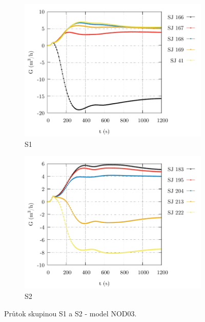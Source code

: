 \begin{figure}
	\centering
	\begin{subfigure}{0.5\textwidth}
		\centering
		\includegraphics[width=\textwidth, trim={0cm 0cm 0cm 0cm}, clip]{./05_TH_model_VR_1/grafy/G_time_nod_03_0.pdf}
				\caption{S1}
		\label{fig:g_time_nod_03_0_prilohy}
	\end{subfigure}%
	\hfill
	\begin{subfigure}{0.5\textwidth}
	\centering
	\includegraphics[width=\textwidth, trim={0cm 0cm 0cm 0cm}, clip]{./05_TH_model_VR_1/grafy/G_time_nod_03_1.pdf}
			\caption{S2}
	\label{fig:g_time_nod_03_1_prilohy}
\end{subfigure}%
	\caption{Průtok skupinou S1 a S2 - model NOD03.}
\end{figure}
